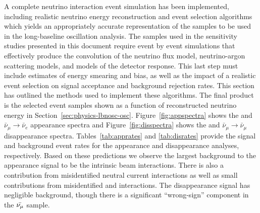 A complete neutrino interaction event simulation has been implemented, including realistic neutrino energy reconstruction and event selection algorithms which yields an appropriately accurate representation of the  samples to be used in the long-baseline oscillation analysis. The samples used in the sensitivity studies presented in this document require event by event simulations that effectively produce the convolution of the neutrino flux model, neutrino-argon scattering models, and models of the detector response. This last step must include estimates of energy smearing and bias, as well as the impact of a realistic event selection on signal acceptance and background rejection rates. This section has outlined the methods used to implement these algorithms. The final product is the  selected  event samples shown as a function of reconstructed neutrino energy in Section~\ref{sec:physics-lbnosc-osc}. Figure~\ref{fig:appspectra} shows the \numutonue and $\bar{\nu}_\mu \to \bar{\nu}_e$ appearance spectra and Figure~\ref{fig:disspectra} shows the \numutonumu and  $\bar{\nu}_\mu \to \bar{\nu}_\mu$ disappearance spectra. Tables~\ref{tab:apprates} and \ref{tab:disrates} provide the signal and background event rates for the appearance and disappearance analyses, respectively. Based on these predictions we observe the largest background to the \nue {} appearance signal to be the intrinsic beam \nue interactions. There is also a contribution from misidentified neutral current interactions as well as small contributions from misidentified \numu and \nutau interactions. The \numu disappearance signal has negligible background, though there is a significant ``wrong-sign''  \numu component in the $\bar{\nu_\mu}$ sample. %


